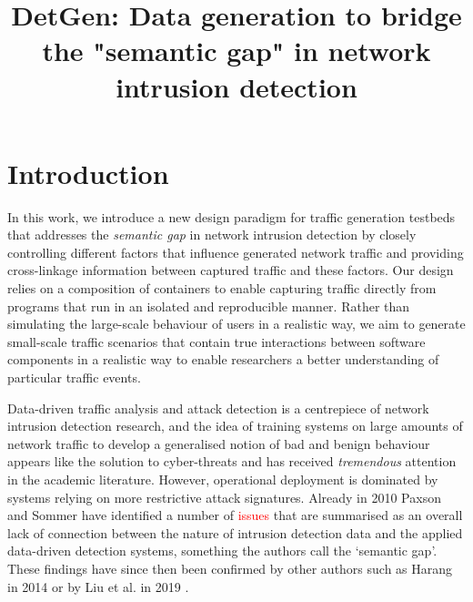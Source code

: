 \documentclass{article}
\begin{document}
\title{DetGen: Data generation to bridge the "semantic gap" in network intrusion detection}

\maketitle







\section{Introduction}



In this work, we introduce a new design paradigm for traffic generation testbeds that addresses the \textit{semantic gap} in network intrusion detection by closely controlling different factors that influence generated network traffic and providing cross-linkage information between captured traffic and these factors. Our design relies on a composition of containers to enable capturing traffic directly from programs that run in an isolated and reproducible manner. Rather than simulating the large-scale behaviour of users in a realistic way, we aim to generate small-scale traffic scenarios that contain true interactions between software components in a realistic way to enable researchers a better understanding of particular traffic events. 

Data-driven traffic analysis and attack detection is a centrepiece of network intrusion detection research, and the idea of training systems on large amounts of network traffic to develop a generalised notion of bad and benign behaviour appears  like the solution to cyber-threats and has received \textit{tremendous} attention in the academic literature. However, operational deployment is dominated by systems relying on more restrictive attack signatures. Already in 2010 Paxson and Sommer \cite{sommer2010outside} have identified a number of \textcolor{red}{issues} that are summarised as an overall lack of connection between the nature of intrusion detection data and the applied data-driven detection systems, something the authors call the `semantic gap'. These findings have since then been confirmed by other authors such as Harang \cite{harang2014bridging} in 2014 or by Liu et al. in 2019 \cite{liu2019machine}.
\end{document}

